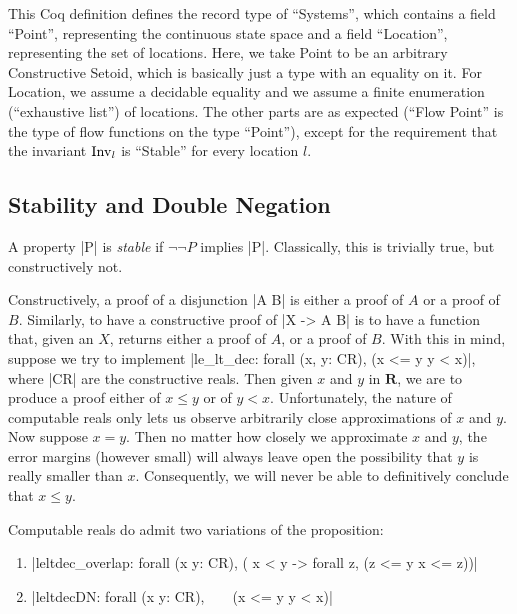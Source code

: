 \documentclass[runningheads]{llncs}
\newcommand{\IR}{{\mathbf R}}
\newcommand{\Inv}{{\rm Inv}}
\newcommand{\leltdec}{{\tt leltdec}}
\begin{document}
This Coq definition defines the record type of ``Systems'', which
contains a field ``Point'', representing the continuous state space
and a field ``Location'', representing the set of locations. Here, we
take Point to be an arbitrary Constructive Setoid, which is basically
just a type with an equality on it. For Location, we assume a
decidable equality and we assume a finite enumeration (``exhaustive
list'') of locations. The other parts are as expected (``Flow Point''
is the type of flow functions on the type ``Point''), except for the
requirement that the invariant $\Inv_l$ is ``Stable'' for every
location $l$.

\subsection{Stability and Double Negation}
\label{dn}

A property |P| is {\em stable\/} if $\neg \neg P$ implies |P|.
Classically, this is trivially true, but constructively
not. 

Constructively, a proof of a disjunction |A \/ B| is
either a proof of $A$ or a proof of $B$. Similarly, to have a constructive
proof of |X -> A \/ B| is to have a function that, given an $X$,
returns either a proof of $A$, or a proof of $B$. With this in mind,
suppose we try to implement |le_lt_dec: forall (x, y: CR), (x <= y \/ y < x)|, where |CR| are the constructive reals. Then given $x$ and $y$ in
$\IR$, we are to produce a proof either of $x \leq y$ or of $y <
x$. Unfortunately, the nature of computable reals only lets us observe
arbitrarily close approximations of $x$ and $y$. Now suppose $x =
y$. Then no matter how closely we approximate $x$ and $y$, the error
margins (however small) will always leave open the possibility that
$y$ is really smaller than $x$. Consequently, we will never be able to
definitively conclude that $x \leq y$.

Computable reals do admit two variations of the proposition:
\begin{enumerate}
\item |leltdec_overlap: forall (x y: CR), ( x < y -> forall z, (z <= y \/ x <= z))|
\item |leltdecDN: forall (x y: CR), ~ ~ (x <= y \/ y < x)|
\end{enumerate}
\end{document}
